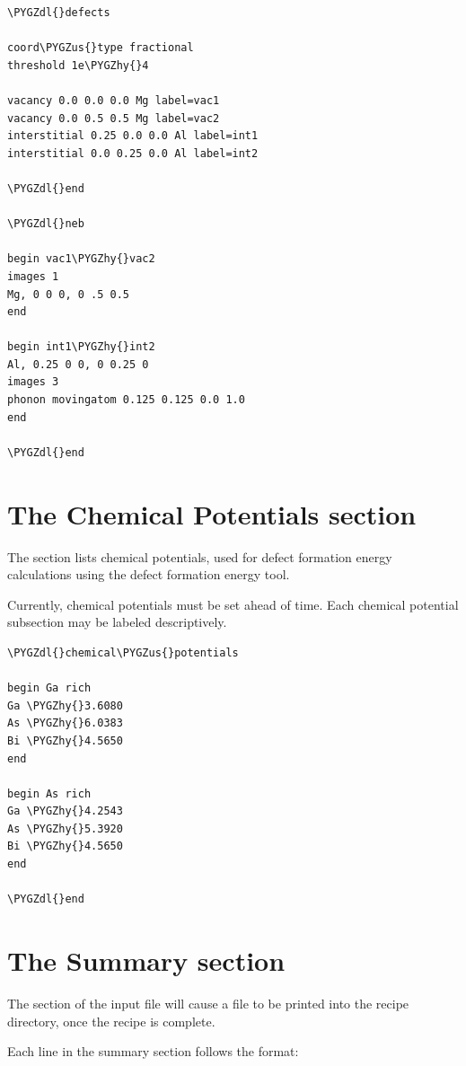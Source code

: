 \documentclass[letterpaper,10pt,english]{sphinxmanual}
\def\PYGZus{\char`\_}
\def\PYGZdl{\char`\$}
\def\PYGZhy{\char`\-}
\begin{document}
\begin{Verbatim}[commandchars=\\\{\}]
\PYGZdl{}defects

coord\PYGZus{}type fractional
threshold 1e\PYGZhy{}4

vacancy 0.0 0.0 0.0 Mg label=vac1
vacancy 0.0 0.5 0.5 Mg label=vac2
interstitial 0.25 0.0 0.0 Al label=int1
interstitial 0.0 0.25 0.0 Al label=int2

\PYGZdl{}end

\PYGZdl{}neb

begin vac1\PYGZhy{}vac2
images 1
Mg, 0 0 0, 0 .5 0.5
end

begin int1\PYGZhy{}int2
Al, 0.25 0 0, 0 0.25 0
images 3
phonon movingatom 0.125 0.125 0.0 1.0
end

\PYGZdl{}end
\end{Verbatim}


\section{The Chemical Potentials section}
\label{3_1_7_chemicalpotentials:the-chemical-potentials-section}\label{3_1_7_chemicalpotentials::doc}
The  section lists chemical potentials, used for defect formation energy calculations using the defect formation energy tool.

Currently, chemical potentials must be set ahead of time. Each chemical potential subsection may be labeled descriptively.

\begin{Verbatim}[commandchars=\\\{\}]
\PYGZdl{}chemical\PYGZus{}potentials

begin Ga rich
Ga \PYGZhy{}3.6080
As \PYGZhy{}6.0383
Bi \PYGZhy{}4.5650
end

begin As rich
Ga \PYGZhy{}4.2543
As \PYGZhy{}5.3920
Bi \PYGZhy{}4.5650
end

\PYGZdl{}end
\end{Verbatim}


\section{The Summary section}
\label{3_1_8_summary:the-summary-section}\label{3_1_8_summary::doc}
The  section of the input file will cause a  file to be printed into the recipe directory, once the recipe is complete.

Each line in the summary section follows the format:
\end{document}
